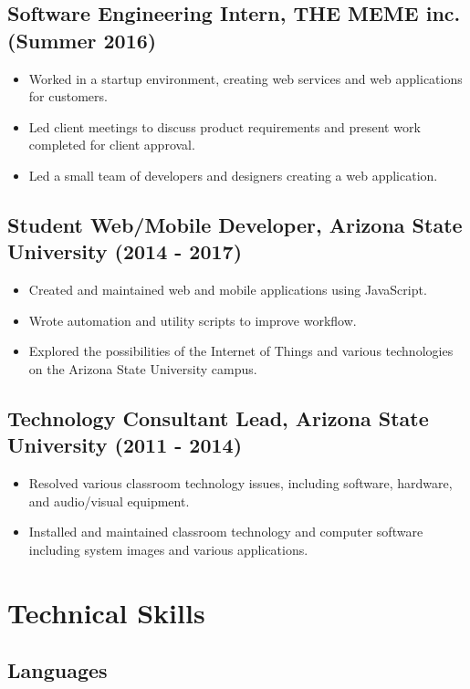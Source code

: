 \documentclass[letterpaper, 10pt]{article}
\begin{document}
\subsection{Software Engineering Intern, THE MEME inc. (Summer 2016)}
\begin{itemize}
\setlength\itemsep{-0.25em}
\item Worked in a startup environment, creating web services and web applications for customers.
\item Led client meetings to discuss product requirements and present work completed for client approval.
\item Led a small team of developers and designers creating a web application.
\end{itemize}

\subsection{Student Web/Mobile Developer, Arizona State University (2014 \-- 2017)}
\begin{itemize}
\setlength\itemsep{-0.25em}
\item Created and maintained web and mobile applications using JavaScript.
\item Wrote automation and utility scripts to improve workflow.
\item Explored the possibilities of the Internet of Things and various technologies on the Arizona State University campus.
\end{itemize}

\subsection{Technology Consultant Lead, Arizona State University (2011 \-- 2014)}
\begin{itemize}
\setlength\itemsep{-0.25em}
\item Resolved various classroom technology issues, including software, hardware, and audio/visual equipment.
\item Installed and maintained classroom technology and computer software including system images and various applications.
\end{itemize}

\section{Technical Skills}

\subsection{Languages}
\end{document}
